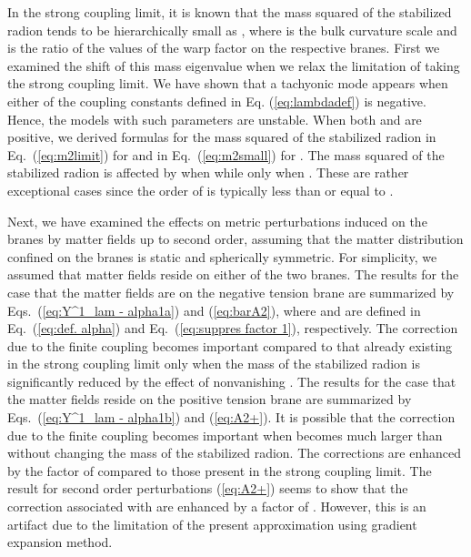 \documentclass[a4paper,showpacs,preprintnumbers,amsmath,amssymb]{revtex4}
\begin{document}
In the strong coupling limit, it is known that the mass squared of the stabilized radion tends to be hierarchically small as \coordHE{}, where \myHighlight{$\ell$}\coordHE{} is the bulk curvature scale and \coordHE{} is the ratio of the values of the warp factor on the respective branes. 
First we examined the shift of this mass eigenvalue when we relax the limitation of taking the strong coupling limit. 
We have shown that a tachyonic mode appears when either of the coupling constants \myHighlight{$\lambda_\pm$}\coordHE{} defined in Eq. (\ref{eq:lambdadef}) is negative. 
Hence, the models with such parameters are unstable. 
When both \myHighlight{$\lambda_+$}\coordHE{} and \myHighlight{$\lambda_-$}\coordHE{} are positive, we derived formulas for the mass squared of the stabilized radion in Eq.~(\ref{eq:m2limit}) for  
\coordHE{} and in Eq.~(\ref{eq:m2small}) for \coordHE{}.  
The mass squared of the stabilized radion is affected by \myHighlight{$\lambda_-$}\coordHE{} when \myHighlight{$\lambda_-\gtrsim \ell$}\coordHE{} while 
\myHighlight{$\lambda_+$}\coordHE{} only when \coordHE{}. 
These are rather exceptional cases since the order of 
\myHighlight{$\lambda_\pm$}\coordHE{} is typically less than or equal to \coordHE{}. 


Next, we have examined the effects on metric perturbations induced on the branes by matter fields up to second order, assuming that the matter distribution confined on the branes is static and spherically symmetric. 
For simplicity, we assumed that matter fields reside on either of the two branes. 
The results for the case that the matter fields are on the negative tension brane are summarized by Eqs.~(\ref{eq:Y^1_lam - alpha1a}) and (\ref{eq:barA2}), 
where \myHighlight{$\alpha_\pm$}\coordHE{} and \myHighlight{$\beta_\pm$}\coordHE{} are defined in 
Eq.~(\ref{eq:def. alpha}) and Eq.~(\ref{eq:suppres factor 1}), respectively. 
The correction due to the finite coupling becomes important compared to that already existing in the strong coupling limit only when the mass of the stabilized radion is significantly reduced by the effect of nonvanishing \myHighlight{$\lambda_\pm$}\coordHE{}.
The results for the case that the matter fields reside on the positive tension brane are summarized by Eqs.~(\ref{eq:Y^1_lam - alpha1b}) and
(\ref{eq:A2+}).  
It is possible that the correction due to the finite coupling becomes important when \myHighlight{$\lambda_+$}\coordHE{} becomes much larger than \myHighlight{$\ell$}\coordHE{} without changing the mass of the stabilized radion. The corrections are enhanced by the factor of \myHighlight{$\lambda_+/\ell$}\coordHE{} compared to those present in the strong coupling limit. 
The result for second order perturbations (\ref{eq:A2+}) seems to show that the correction associated with \myHighlight{$\lambda_-$}\coordHE{} are enhanced by a factor of \coordHE{}. 
However, this is an artifact due to the limitation of the present approximation using gradient expansion method. 
\end{document}
